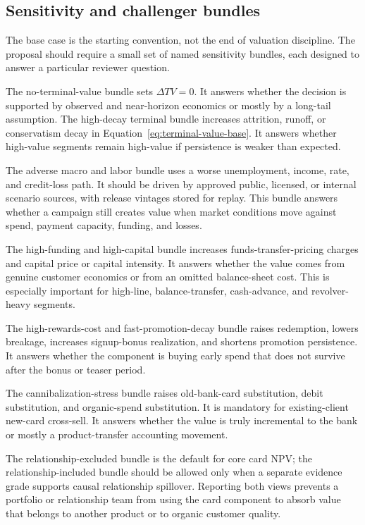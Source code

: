 \documentclass[11pt]{article}
\newcommand{\1}{\mathbf{1}}
\begin{document}
\subsection{Sensitivity and challenger bundles}
\label{subsec:valuation-sensitivities}

The base case is the starting convention, not the end of valuation discipline.
The proposal should require a small set of named sensitivity bundles, each
designed to answer a particular reviewer question.

The no-terminal-value bundle sets $\Delta TV=0$. It answers whether the
decision is supported by observed and near-horizon economics or mostly by a
long-tail assumption. The high-decay terminal bundle increases attrition,
runoff, or conservatism decay in Equation~\eqref{eq:terminal-value-base}. It
answers whether high-value segments remain high-value if persistence is weaker
than expected.

The adverse macro and labor bundle uses a worse unemployment, income, rate,
and credit-loss path. It should be driven by approved public, licensed, or
internal scenario sources, with release vintages stored for replay. This
bundle answers whether a campaign still creates value when market conditions
move against spend, payment capacity, funding, and losses.

The high-funding and high-capital bundle increases funds-transfer-pricing
charges and capital price or capital intensity. It answers whether the value
comes from genuine customer economics or from an omitted balance-sheet cost.
This is especially important for high-line, balance-transfer, cash-advance,
and revolver-heavy segments.

The high-rewards-cost and fast-promotion-decay bundle raises redemption,
lowers breakage, increases signup-bonus realization, and shortens promotion
persistence. It answers whether the component is buying early spend that does
not survive after the bonus or teaser period.

The cannibalization-stress bundle raises old-bank-card substitution, debit
substitution, and organic-spend substitution. It is mandatory for
existing-client new-card cross-sell. It answers whether the value is truly
incremental to the bank or mostly a product-transfer accounting movement.

The relationship-excluded bundle is the default for core card NPV; the
relationship-included bundle should be allowed only when a separate evidence
grade supports causal relationship spillover. Reporting both views prevents a
portfolio or relationship team from using the card component to absorb value
that belongs to another product or to organic customer quality.
\end{document}
